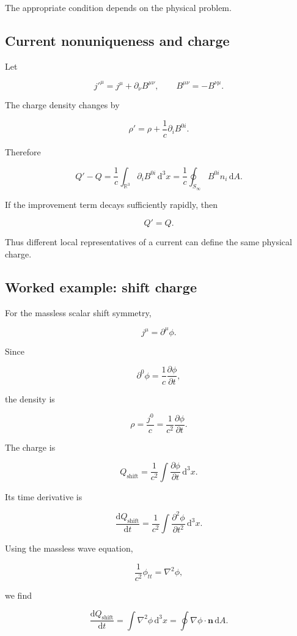 The appropriate condition depends on the physical problem.

\subsection{Current nonuniqueness and charge}

Let

\[
j'^{\mu}
=
j^{\mu}
+
\partial_{\nu}B^{\mu\nu},
\qquad
B^{\mu\nu}
=
-B^{\nu\mu}.
\]

The charge density changes by

\[
\rho'
=
\rho
+
\frac{1}{c}
\partial_iB^{0i}.
\]

Therefore

\[
Q'-Q
=
\frac{1}{c}
\int_{\mathbb{R}^{3}}
\partial_iB^{0i}
\,\mathrm{d}^{3}x
=
\frac{1}{c}
\oint_{S_{\infty}}
B^{0i}n_i
\,\mathrm{d}A.
\]

If the improvement term decays sufficiently rapidly, then

\[
Q'=Q.
\]

Thus different local representatives of a current can define the same physical charge.

\subsection{Worked example: shift charge}

For the massless scalar shift symmetry,

\[
j^{\mu}
=
\partial^{\mu}\phi.
\]

Since

\[
\partial^{0}\phi
=
\frac{1}{c}
\frac{\partial\phi}{\partial t},
\]

the density is

\[
\rho
=
\frac{j^{0}}{c}
=
\frac{1}{c^{2}}
\frac{\partial\phi}{\partial t}.
\]

The charge is

\[
\boxed{
Q_{\mathrm{shift}}
=
\frac{1}{c^{2}}
\int
\frac{\partial\phi}{\partial t}
\,\mathrm{d}^{3}x
}.
\]

Its time derivative is

\[
\frac{\mathrm{d}Q_{\mathrm{shift}}}{\mathrm{d}t}
=
\frac{1}{c^{2}}
\int
\frac{\partial^{2}\phi}{\partial t^{2}}
\,\mathrm{d}^{3}x.
\]

Using the massless wave equation,

\[
\frac{1}{c^{2}}\phi_{tt}
=
\nabla^{2}\phi,
\]

we find

\[
\frac{\mathrm{d}Q_{\mathrm{shift}}}{\mathrm{d}t}
=
\int
\nabla^{2}\phi
\,\mathrm{d}^{3}x
=
\oint
\nabla\phi\cdot\mathbf{n}
\,\mathrm{d}A.
\]

